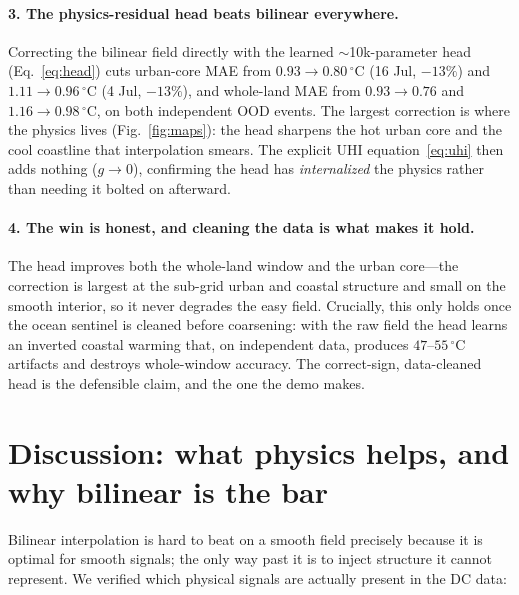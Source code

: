 \documentclass[11pt]{article}
\begin{document}
\paragraph{3. The physics-residual head beats bilinear everywhere.} Correcting the
bilinear field directly with the learned $\sim$10k-parameter head
(Eq.~\ref{eq:head}) cuts urban-core MAE from $0.93\!\to\!0.80\,^\circ\mathrm{C}$
(16 Jul, $-13\%$) and $1.11\!\to\!0.96\,^\circ\mathrm{C}$ (4 Jul, $-13\%$), and
whole-land MAE from $0.93\!\to\!0.76$ and $1.16\!\to\!0.98\,^\circ\mathrm{C}$, on
both independent OOD events. The largest correction is where the physics lives
(Fig.~\ref{fig:maps}): the head sharpens the hot urban core and the cool coastline
that interpolation smears. The explicit UHI equation~\eqref{eq:uhi} then adds
nothing ($g\!\to\!0$), confirming the head has \emph{internalized} the physics
rather than needing it bolted on afterward.

\paragraph{4. The win is honest, and cleaning the data is what makes it hold.} The
head improves both the whole-land window and the urban core---the correction is
largest at the sub-grid urban and coastal structure and small on the smooth
interior, so it never degrades the easy field. Crucially, this only holds once the
ocean sentinel is cleaned before coarsening: with the raw field the head learns an
inverted coastal warming that, on independent data, produces
$47$--$55\,^\circ\mathrm{C}$ artifacts and destroys whole-window accuracy. The
correct-sign, data-cleaned head is the defensible claim, and the one the demo
makes.

\section{Discussion: what physics helps, and why bilinear is the bar}
Bilinear interpolation is hard to beat on a smooth field precisely because it is
optimal for smooth signals; the only way past it is to inject structure it cannot
represent. We verified which physical signals are actually present in the DC data:
\end{document}
